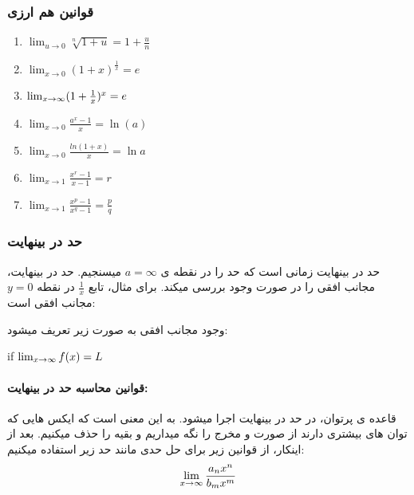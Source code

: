 \documentclass[12pt, a4paper, oneside]{article}
\begin{document}
\subsubsection{قوانین هم ارزی}
\begin{latin}
    \begin{enumerate}
        \item $\lim_{u\to0} {\sqrt[n]{1+u} = 1+\frac{u}{n}}$
        \item $\lim_{x\to0} {(1+x)^{ \frac{1}{x} }} = e$
        \item $\lim_{x \to \infty} (1+\frac{1}{x})^x = e$
        \item $\lim_{x\to 0} {\frac{a^x-1}{x}} = \ln(a)$
        \item $\lim_{x\to 0} \frac{ln(1+x)}{x} = \ln a$
        \item $\lim_{ x\to1 } \frac{ x^r - 1 }{ x-1 } = r$
        \item $\lim_{ x\to1 } \frac{ x^p - 1 }{ x^q - 1 } = \frac{p}{q}$
    \end{enumerate}
\end{latin}

\subsubsection{حد در بینهایت}
حد در بینهایت زمانی است که حد را در نقطه ی $a=\infty$ میسنجیم. حد در بینهایت، مجانب افقی را در صورت وجود بررسی میکند.
برای مثال، تابع $\frac{1}{x}$ در نقطه $y=0$ مجانب افقی است:


\noindent
وجود مجانب افقی به صورت زیر تعریف میشود:

\begin{latin}
\begin{center}
    if $\lim_{x \to \infty} f(x) = L$
\end{center}
\end{latin}
\paragraph{
قوانین محاسبه حد در بینهایت:
\\}
قاعده ی پرتوان، در حد در بینهایت اجرا میشود. به این معنی است که ایکس هایی که توان های بیشتری دارند از صورت و مخرج را نگه میداریم و بقیه را حذف میکنیم.
بعد از اینکار، از قوانین زیر برای حل حدی مانند حد زیر استفاده میکنیم: 
\[\lim_{x \to \infty} \frac{a_nx^n}{b_mx^m}\]
\end{document}
